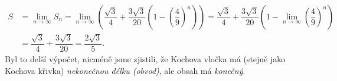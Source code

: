 \begin{align*}
    S&=\lim_{n\to\infty}S_n=\lim_{n\to\infty}\left(\dfrac{\sqrt{3}}{4}+\dfrac{3\sqrt{3}}{20}\left(1-\left(\dfrac{4}{9}\right)^n\right)\right)=\dfrac{\sqrt{3}}{4}+\dfrac{3\sqrt{3}}{20}\left(1-\lim_{n\to\infty}\left(\dfrac{4}{9}\right)^n\right)\\
    &=\dfrac{\sqrt{3}}{4}+\dfrac{3\sqrt{3}}{20}=\dfrac{2\sqrt{3}}{5}.
\end{align*}
Byl to delší výpočet, nicméně jsme zjistili, že Kochova vločka má (stejně jako Kochova křivka) \emph{nekonečnou délku (obvod)}, ale obsah má \emph{konečný}.